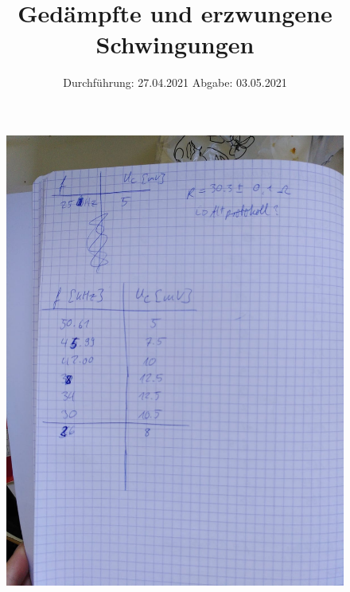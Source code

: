 

\subject{V354}
\title{Gedämpfte und erzwungene Schwingungen}
\date{%
  Durchführung: 27.04.2021
  \hspace{3em}
  Abgabe: 03.05.2021
}



\maketitle
\thispagestyle{empty}
\tableofcontents
\newpage






\printbibliography{}
\begin{figure}
  \centering
  \includegraphics{anhang1.jpeg}
\end{figure}
